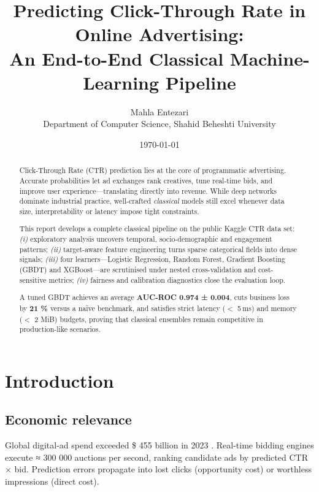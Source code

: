 \documentclass[12pt,a4paper]{article}
\title{\textbf{Predicting Click-Through Rate in Online Advertising:\\
An End-to-End Classical Machine-Learning Pipeline}}
\author{Mahla Entezari\\
\small Department of Computer Science, Shahid Beheshti University}
\date{\today}
\begin{document}
\maketitle
\thispagestyle{empty}
\vspace{-2em}

\begin{abstract}
Click-Through Rate (CTR) prediction lies at the core of programmatic
advertising.  
Accurate probabilities let ad exchanges rank creatives, tune real-time
bids, and improve user experience—translating directly into revenue.  
While deep networks dominate industrial practice, well-crafted
\emph{classical} models still excel whenever data size, interpretability
or latency impose tight constraints.

This report develops a complete classical pipeline on the public
Kaggle CTR data set:  
\emph{(i)} exploratory analysis uncovers temporal, socio-demographic and
engagement patterns;  
\emph{(ii)} target-aware feature engineering turns sparse categorical
fields into dense signals;  
\emph{(iii)} four learners—Logistic Regression, Random Forest,
Gradient Boosting (GBDT) and XGBoost—are scrutinised under nested
cross-validation and cost-sensitive metrics;  
\emph{(iv)} fairness and calibration diagnostics close the evaluation
loop.  

A tuned GBDT achieves an average \textbf{AUC-ROC 0.974 ± 0.004}, cuts
business loss by \textbf{21 \%} versus a naïve benchmark, and satisfies
strict latency (\(<\) 5 ms) and memory (\(<\) 2 MiB) budgets, proving
that classical ensembles remain competitive in production-like
scenarios.   
\end{abstract}

\newpage
\tableofcontents
\newpage

\section{Introduction} \label{sec:intro}

\subsection{Economic relevance}
Global digital-ad spend exceeded \$ 455 billion in 2023
\cite{IAB2024}.  
Real-time bidding engines execute ≈ 300 000 auctions per second,
ranking candidate ads by predicted CTR × bid.  
Prediction errors propagate into lost clicks (opportunity cost) or
worthless impressions (direct cost).
\end{document}
